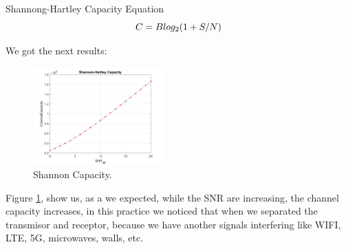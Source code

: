 Shannong-Hartley Capacity Equation
\begin{equation}
	C = Blog_{2}(1+S/N)\\
\end{equation}

We got the next results:

\begin{figure}[!htbp]
	\centering
	\includegraphics[width=5cm]{images/shannon_capacity.png}
	\caption{Shannon Capacity.}
	\label{fig:shannon}
\end{figure}

Figure \ref{fig:shannon}, show us, as a we expected, while the SNR are increasing, the channel capacity increases, in this practice we noticed that when we separated the transmisor and receptor, because we have another signals interfering like WIFI, LTE, 5G, microwaves, walls, etc. 
